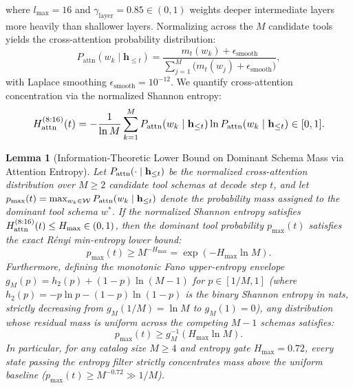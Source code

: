 \documentclass[10pt,conference]{IEEEtran}
\newtheorem{lemma}{Lemma}
\begin{document}
where $l_{\max} = 16$ and $\gamma_{\text{layer}} = 0.85 \in (0, 1)$ weights deeper intermediate layers more heavily than shallower layers. Normalizing across the $M$ candidate tools yields the cross-attention probability distribution:
\begin{equation}
P_{\text{attn}}(w_k \mid \mathbf{h}_{\le t}) = \frac{m_t(w_k) + \epsilon_{\text{smooth}}}{\sum_{j=1}^M \big(m_t(w_j) + \epsilon_{\text{smooth}}\big)},
\label{eq:attn_prob}
\end{equation}
with Laplace smoothing $\epsilon_{\text{smooth}} = 10^{-12}$. We quantify cross-attention concentration via the normalized Shannon entropy:
\begin{equation}
\resizebox{0.88\columnwidth}{!}{$\displaystyle
H_{\text{attn}}^{(8:16)}(t) = -\frac{1}{\ln M} \sum_{k=1}^M P_{\text{attn}}(w_k \mid \mathbf{h}_{\le t}) \ln P_{\text{attn}}(w_k \mid \mathbf{h}_{\le t}) \in [0, 1].
$}
\label{eq:shannon_entropy}
\end{equation}

\begin{lemma}[Information-Theoretic Lower Bound on Dominant Schema Mass via Attention Entropy]
\label{lem:entropy_collapse}
Let $P_{\textnormal{attn}}(\cdot \mid \mathbf{h}_{\le t})$ be the normalized cross-attention distribution over $M \ge 2$ candidate tool schemas at decode step $t$, and let $p_{\max}(t) = \max_{w_k \in \mathcal{W}} P_{\textnormal{attn}}(w_k \mid \mathbf{h}_{\le t})$ denote the probability mass assigned to the dominant tool schema $w^*$. If the normalized Shannon entropy satisfies $H_{\textnormal{attn}}^{(8:16)}(t) \le H_{\max} \in (0, 1)$, then the dominant tool probability $p_{\max}(t)$ satisfies the exact R\'enyi min-entropy lower bound:
\begin{equation}
p_{\max}(t) \ge M^{-H_{\max}} = \exp\!\left(-H_{\max} \ln M\right).
\label{eq:renyi_min_bound}
\end{equation}
Furthermore, defining the monotonic Fano upper-entropy envelope $g_M(p) = h_2(p) + (1-p)\ln(M-1)$ for $p \in [1/M, 1]$ (where $h_2(p) = -p \ln p - (1-p)\ln(1-p)$ is the binary Shannon entropy in nats, strictly decreasing from $g_M(1/M) = \ln M$ to $g_M(1) = 0$), any distribution whose residual mass is uniform across the competing $M-1$ schemas satisfies:
\begin{equation}
p_{\max}(t) \ge g_M^{-1}\!\left(H_{\max} \ln M\right).
\label{eq:fano_entropy_envelope}
\end{equation}
In particular, for any catalog size $M \ge 4$ and entropy gate $H_{\max} = 0.72$, every state passing the entropy filter strictly concentrates mass above the uniform baseline ($p_{\max}(t) \ge M^{-0.72} \gg 1/M$).
\end{lemma}
\end{document}
